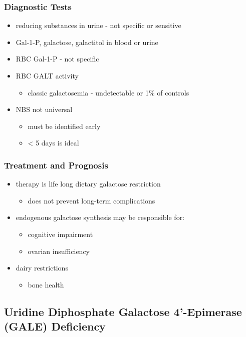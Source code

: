 \documentclass{scrartcl}
\begin{document}
\subsubsection{Diagnostic Tests}
\label{sec:orge5cc4bb}
\begin{itemize}
\item reducing substances in urine - not specific or sensitive
\item Gal-1-P, galactose, galactitol in blood or urine
\item RBC Gal-1-P - not specific
\item RBC GALT activity
\begin{itemize}
\item classic galactosemia - undetectable or 1\% of controls
\end{itemize}
\item NBS not universal
\begin{itemize}
\item must be identified early
\item \textless{} 5 days is ideal
\end{itemize}
\end{itemize}

\subsubsection{Treatment and Prognosis}
\label{sec:org161105f}
\begin{itemize}
\item therapy is life long dietary galactose restriction
\begin{itemize}
\item does not prevent long-term complications
\end{itemize}

\item endogenous galactose synthesis may be responsible for:
\begin{itemize}
\item cognitive impairment
\item ovarian insufficiency
\end{itemize}
\item dairy restrictions
\begin{itemize}
\item bone health
\end{itemize}
\end{itemize}

\subsection{Uridine Diphosphate Galactose 4’-Epimerase (GALE) Deficiency}
\label{sec:org51d68fb}
\end{document}

